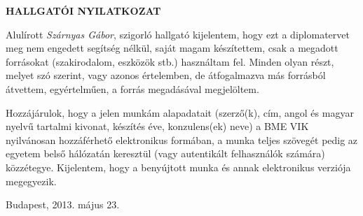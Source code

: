 
\begin{center}
\large
\textbf{HALLGATÓI NYILATKOZAT}\\
\end{center}

Alulírott \emph{Szárnyas Gábor}, szigorló hallgató kijelentem, hogy ezt a diplomatervet meg nem engedett segítség nélkül, saját magam készítettem, csak a megadott forrásokat (szakirodalom, eszközök stb.) használtam fel. Minden olyan részt, melyet szó szerint, vagy azonos értelemben, de átfogalmazva más forrásból átvettem, egyértelműen, a forrás megadásával megjelöltem.

Hozzájárulok, hogy a jelen munkám alapadatait (szerző(k), cím, angol és magyar nyel\-vű tartalmi kivonat, készítés éve, konzulens(ek) neve) a BME VIK nyilvánosan hozzáférhető elektronikus formában, a munka teljes szövegét pedig az egyetem belső hálózatán keresztül (vagy autentikált felhasználók számára) közzétegye. Kijelentem, hogy a benyújtott munka és annak elektronikus verziója megegyezik.

\begin{flushleft}
\vspace*{1cm}
Budapest, 2013. május 23.
\end{flushleft}

\begin{flushright}
 \vspace*{1cm}
 \makebox[7cm]{\rule{6cm}{.4pt}}\\
 \\
\end{flushright}
\thispagestyle{empty}

\vfill
\clearpage
\thispagestyle{empty} %
